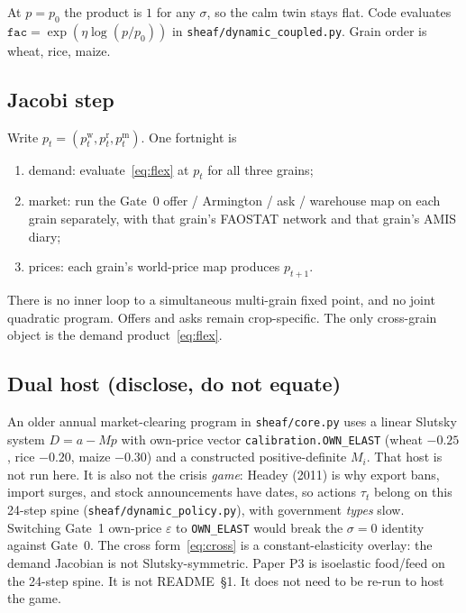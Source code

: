 At \(p=p_0\) the product is \(1\) for any \(\sigma\), so the calm twin stays
flat. Code evaluates \(\mathtt{fac}=\exp(\eta\log(p/p_0))\) in
\texttt{sheaf/dynamic\_coupled.py}. Grain order is wheat, rice, maize.

\begin{table}[H]
\centering
\caption{Worked \(\eta\) on the reported band. Maize answers wheat more than
wheat answers maize because \(|\varepsilon_{\mathrm{maize}}|>
|\varepsilon_{\mathrm{wheat}}|\). That asymmetry is~\eqref{eq:cross}, not a
coding error.}
\label{tab:eta}
\small

\end{table}

\subsection{Jacobi step}
\label{sec:jacobi}

Write \(p_t=(p^{\mathrm{w}}_t,p^{\mathrm{r}}_t,p^{\mathrm{m}}_t)\). One
fortnight is
\begin{enumerate}
\item demand: evaluate~\eqref{eq:flex} at \(p_t\) for all three grains;
\item market: run the Gate~0 offer / Armington / ask / warehouse map on each
      grain separately, with that grain's FAOSTAT network and that grain's
      AMIS diary;
\item prices: each grain's world-price map produces \(p_{t+1}\).
\end{enumerate}
There is no inner loop to a simultaneous multi-grain fixed point, and no
joint quadratic program. Offers and asks remain crop-specific. The only
cross-grain object is the demand product~\eqref{eq:flex}.

\subsection{Dual host (disclose, do not equate)}
\label{sec:dual}

An older annual market-clearing program in \texttt{sheaf/core.py} uses a
linear Slutsky system \(D=a-Mp\) with own-price vector
\texttt{calibration.OWN\_ELAST} (wheat \(-0.25\), rice \(-0.20\), maize
\(-0.30\)) and a constructed positive-definite \(M_i\). That host is not
run here. It is also not the crisis \emph{game}: Headey (2011) is why
export bans, import surges, and stock announcements have dates, so
actions \(\tau_t\) belong on this 24-step spine
(\texttt{sheaf/dynamic\_policy.py}), with government \emph{types} slow.
Switching Gate~1 own-price \(\varepsilon\) to
\texttt{OWN\_ELAST} would break the \(\sigma=0\) identity against Gate~0.
The cross form~\eqref{eq:cross} is a constant-elasticity overlay: the
demand Jacobian is not Slutsky-symmetric. Paper P3 is isoelastic food/feed
on the 24-step spine. It is not README~\S1. It does not need to be
re-run to host the game.

